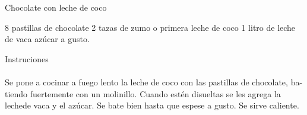 \documentclass{article}
\begin{document}
  {\noindent \huge Chocolate con leche de coco}
  \vspace{1cm}

  \begin{multicols}{2}
  \noindent \color{light} 8 pastillas de chocolate 2 tazas de zumo o primera leche de coco
  \columnbreak
      \noindent \color{light} 1 litro de leche de vaca azúcar a gusto.
    \end{multicols}
  \vspace{1cm}

  {\noindent \LARGE Instruciones}\\
  \\
  \noindent \color{light} Se pone a cocinar a fuego lento la leche de coco con las pastillas de
chocolate, ba-tiendo fuertemente con un molinillo. Cuando estén
disueltas se les agrega la lechede vaca y el azú­car. Se bate bien hasta
que espese a gusto. Se sirve caliente.
\end{document}
